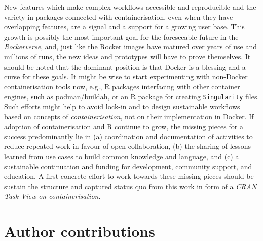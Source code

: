 New features which make complex workflows accessible and reproducible
and the variety in packages connected with containerisation, even when
they have overlapping features, are a signal and a support for a growing
user base. This growth is possibly the most important goal for the
foreseeable future in the \emph{Rockerverse}, and, just like the Rocker
images have matured over years of use and millions of runs, the new
ideas and prototypes will have to prove themselves. It should be noted
that the dominant position is that Docker is a blessing and a curse for
these goals. It might be wise to start experimenting with non-Docker
containerisation tools now, e.g., R packages interfacing with other
container engines, such as
\href{https://github.com/containers/libpod}{podman/buildah}, or an R
package for creating \texttt{Singularity} files. Such efforts might help
to avoid lock-in and to design sustainable workflows based on concepts
of \emph{containerisation}, not on their implementation in Docker. If
adoption of containerisation and R continue to grow, the missing pieces
for a success predominantly lie in (a) coordination and documentation of
activities to reduce repeated work in favour of open collaboration, (b)
the sharing of lessons learned from use cases to build common knowledge
and language, and (c) a sustainable continuation and funding for
development, community support, and education. A first concrete effort
to work towards these missing pieces should be sustain the structure and
captured status quo from this work in form of a \emph{CRAN Task View on
containerisation}.

\hypertarget{author-contributions}{%
\section{Author contributions}\label{author-contributions}}

